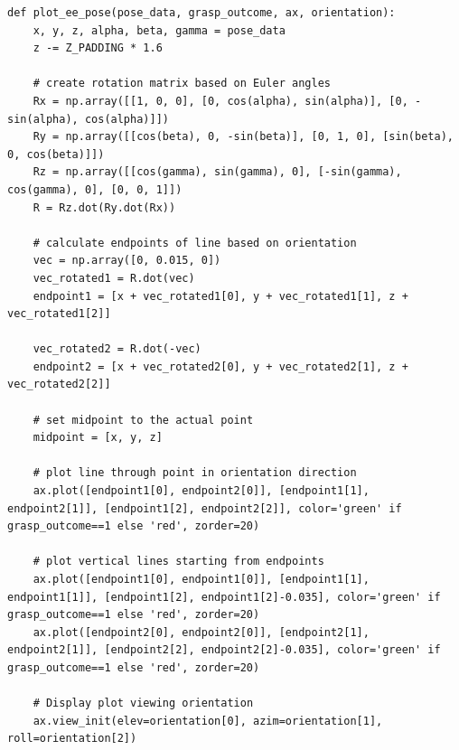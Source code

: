 \documentclass[11pt, a4paper]{report}
\begin{document}
\begin{lstlisting}
def plot_ee_pose(pose_data, grasp_outcome, ax, orientation):
    x, y, z, alpha, beta, gamma = pose_data
    z -= Z_PADDING * 1.6

    # create rotation matrix based on Euler angles
    Rx = np.array([[1, 0, 0], [0, cos(alpha), sin(alpha)], [0, -sin(alpha), cos(alpha)]])
    Ry = np.array([[cos(beta), 0, -sin(beta)], [0, 1, 0], [sin(beta), 0, cos(beta)]])
    Rz = np.array([[cos(gamma), sin(gamma), 0], [-sin(gamma), cos(gamma), 0], [0, 0, 1]])
    R = Rz.dot(Ry.dot(Rx))

    # calculate endpoints of line based on orientation
    vec = np.array([0, 0.015, 0])
    vec_rotated1 = R.dot(vec)
    endpoint1 = [x + vec_rotated1[0], y + vec_rotated1[1], z + vec_rotated1[2]]
    
    vec_rotated2 = R.dot(-vec)
    endpoint2 = [x + vec_rotated2[0], y + vec_rotated2[1], z + vec_rotated2[2]]

    # set midpoint to the actual point
    midpoint = [x, y, z]

    # plot line through point in orientation direction
    ax.plot([endpoint1[0], endpoint2[0]], [endpoint1[1], endpoint2[1]], [endpoint1[2], endpoint2[2]], color='green' if grasp_outcome==1 else 'red', zorder=20)

    # plot vertical lines starting from endpoints
    ax.plot([endpoint1[0], endpoint1[0]], [endpoint1[1], endpoint1[1]], [endpoint1[2], endpoint1[2]-0.035], color='green' if grasp_outcome==1 else 'red', zorder=20)
    ax.plot([endpoint2[0], endpoint2[0]], [endpoint2[1], endpoint2[1]], [endpoint2[2], endpoint2[2]-0.035], color='green' if grasp_outcome==1 else 'red', zorder=20)

    # Display plot viewing orientation
    ax.view_init(elev=orientation[0], azim=orientation[1], roll=orientation[2])



\end{lstlisting}
\end{document}

